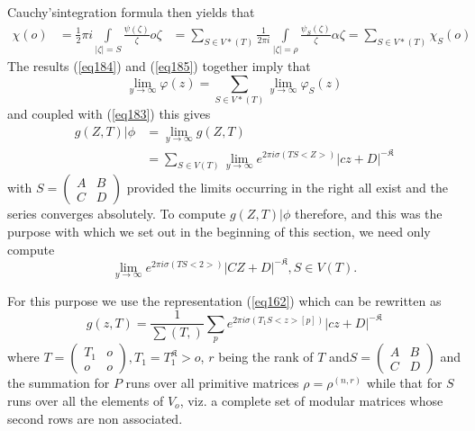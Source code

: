 Cauchy's\pageoriginale  integration formula then yields that
\begin{align*} 
\chi (o) & = \frac{1}{2} \pi i \int\limits_{| \zeta | = S} \frac{\psi
  (\zeta)}{\zeta} o \zeta 
& = \sum_{S \in V* (T)} \frac{1}{2 \pi i} \int\limits_{| \zeta | =
  \rho} \frac{\psi_S (\zeta)}{\zeta} \alpha \zeta = \sum_{S \in V*
  (T)} \chi_S (o) \tag{185}\label{eq185}  
\end{align*}
The results (\ref{eq184}) and (\ref{eq185}) together imply that 
\begin{equation*} 
\lim_{y \to \infty} \varphi (z) = \sum_{S \in V*(T)} \lim_{y \to
  \infty} \varphi_S (z) \tag{186}\label{eq186}  
\end{equation*}
and coupled with (\ref{eq183}) this gives
\begin{align*}
g (Z, T) | \phi & = \lim_{y \to \infty} g (Z, T)\\
& = \sum_{S \in V (T)} \lim_{y \to \infty} e^{2 \pi i \sigma (T S
  <Z>)} | c z + D|^{-\mathfrak{K}} \tag{187}\label{eq187}  
\end{align*}
with $S = \begin{pmatrix} A & B \\ C & D \end{pmatrix}$ provided the
limits occurring in the right all exist and the series converges
absolutely. To compute $g (Z, T) | \phi$ therefore, and this was the
purpose with which we set out in the beginning of this section, we
need only compute  
$$
\lim_{y \to \infty} e^{2 \pi i \sigma (T S < 2 >)} | C Z + D|^{-
  \mathfrak{K}}, S \in V (T). 
$$

For this purpose we use the representation (\ref{eq162}) which can be
rewritten as 
\begin{equation*}
g(z, T) = \frac{1}{\sum (T,)} \sum_p e^{2 \pi i \sigma (T_1 S < z>
  [p])} |  c z + D|^{-\mathfrak{K}} \tag*{$(162')$}\label{eq162'}  
\end{equation*}
where $T = \begin{pmatrix} T_1 & o \\ o & o \end{pmatrix}, T_1 =
T_1^{\mathfrak{K}}> o$, $r$ being the rank of $T$ and\pageoriginale  $S
= \begin{pmatrix} A & B \\ C & D \end{pmatrix}$ and the summation for
$P$ runs over all primitive matrices $\rho = \rho^{(n, r)}$ while that
for $S$ runs over all the elements of $V_o$, viz. a complete set of
modular matrices whose second rows are non associated.  

